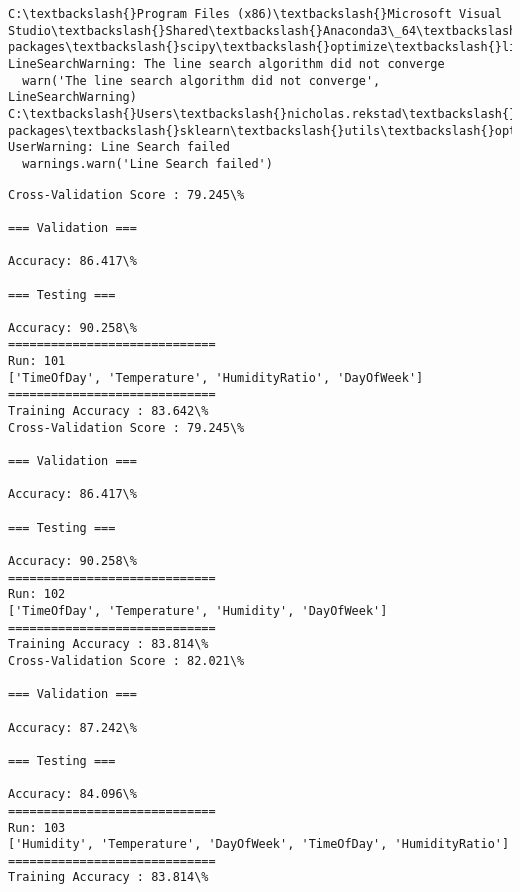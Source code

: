 \documentclass[11pt]{article}
\begin{document}
    \begin{Verbatim}[commandchars=\\\{\}]
C:\textbackslash{}Program Files (x86)\textbackslash{}Microsoft Visual Studio\textbackslash{}Shared\textbackslash{}Anaconda3\_64\textbackslash{}lib\textbackslash{}site-packages\textbackslash{}scipy\textbackslash{}optimize\textbackslash{}linesearch.py:313: LineSearchWarning: The line search algorithm did not converge
  warn('The line search algorithm did not converge', LineSearchWarning)
C:\textbackslash{}Users\textbackslash{}nicholas.rekstad\textbackslash{}AppData\textbackslash{}Roaming\textbackslash{}Python\textbackslash{}Python36\textbackslash{}site-packages\textbackslash{}sklearn\textbackslash{}utils\textbackslash{}optimize.py:195: UserWarning: Line Search failed
  warnings.warn('Line Search failed')

    \end{Verbatim}

    \begin{Verbatim}[commandchars=\\\{\}]
Cross-Validation Score : 79.245\%

=== Validation ===

Accuracy: 86.417\%

=== Testing ===

Accuracy: 90.258\%
=============================
Run: 101
['TimeOfDay', 'Temperature', 'HumidityRatio', 'DayOfWeek']
=============================
Training Accuracy : 83.642\%
Cross-Validation Score : 79.245\%

=== Validation ===

Accuracy: 86.417\%

=== Testing ===

Accuracy: 90.258\%
=============================
Run: 102
['TimeOfDay', 'Temperature', 'Humidity', 'DayOfWeek']
=============================
Training Accuracy : 83.814\%
Cross-Validation Score : 82.021\%

=== Validation ===

Accuracy: 87.242\%

=== Testing ===

Accuracy: 84.096\%
=============================
Run: 103
['Humidity', 'Temperature', 'DayOfWeek', 'TimeOfDay', 'HumidityRatio']
=============================
Training Accuracy : 83.814\%

    \end{Verbatim}
\end{document}
